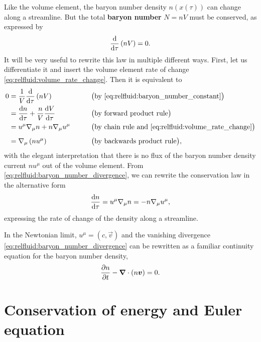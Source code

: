 Like the volume element, the baryon number density $n(x(\tau))$ can change along a streamline.
But the total \textbf{baryon number} $N = n V$ must be conserved, as expressed by
\begin{equation}
	\odv*{\left( n V \right)}{\tau} = 0 .
\label{eq:relfluid:baryon_number_constant}
\end{equation}
It will be very useful to rewrite this law in multiple different ways.
First, let us differentiate it and insert the volume element rate of change \eqref{eq:relfluid:volume_rate_change}.
Then it is equivalent to
\begin{align}
	0 &= \frac{1}{V} \odv*{\left( n V \right)}{\tau} && \qquad \big( \text{by \eqref{eq:relfluid:baryon_number_constant}} \big) \nonumber \\
	  &= \odv{n}{\tau} + \frac{n}{V} \odv{V}{\tau} && \qquad \big( \text{by forward product rule} \big) \nonumber \\
	  &= u^\mu \nabla_\mu n + n \nabla_\mu u^\mu && \qquad \big( \text{by chain rule and \eqref{eq:relfluid:volume_rate_change}} \big) \nonumber \\[1.0ex]
	  &= \nabla_\mu \left( n u^\mu \right) && \qquad \big( \text{by backwards product rule} \big), \label{eq:relfluid:baryon_number_divergence}
\end{align}
with the elegant interpretation that there is no flux of the baryon number density current $n u^\mu$ out of the volume element.
From \cref{eq:relfluid:baryon_number_divergence}, we can rewrite the conservation law in the alternative form
\begin{equation}
	\odv{n}{\tau} = u^\mu \nabla_\mu n
	              = -n \nabla_\mu u^\mu ,
\label{eq:relfluid:baryon_number_rate_change}
\end{equation}
expressing the rate of change of the density along a streamline.

In the Newtonian limit, $u^\mu = (c, \vec{v})$ and the vanishing divergence \cref{eq:relfluid:baryon_number_divergence} can be rewritten as a familiar continuity equation for the baryon number density,
\begin{equation}
	\pdv{n}{t} - {\bm{\nabla}} \cdot \left( n {\bm{v}} \right) = 0.
\end{equation}

\section{Conservation of energy and Euler equation}

